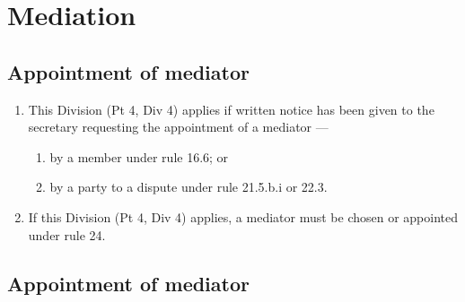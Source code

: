 \documentclass[../constitution.tex]{subfiles}
\begin{document}
\hypertarget{division-4-mediation}{%
\section{Mediation}\label{division-4-mediation}}

\hypertarget{appointment-of-mediator}{%
\subsection{Appointment of mediator}\label{appointment-of-mediator}}

\begin{enumerate}

\item This Division (Pt 4, Div 4) applies if written notice has been given to the secretary requesting the appointment of a mediator ---

  \begin{enumerate}
  
  \item by a member under rule 16.6; or
  \item by a party to a dispute under rule 21.5.b.i or 22.3.
  \end{enumerate}
\item If this Division (Pt 4, Div 4) applies, a mediator must be chosen or appointed under rule 24.
\end{enumerate}

\hypertarget{appointment-of-mediator-1}{%
\subsection{Appointment of mediator}\label{appointment-of-mediator-1}}
\end{document}
